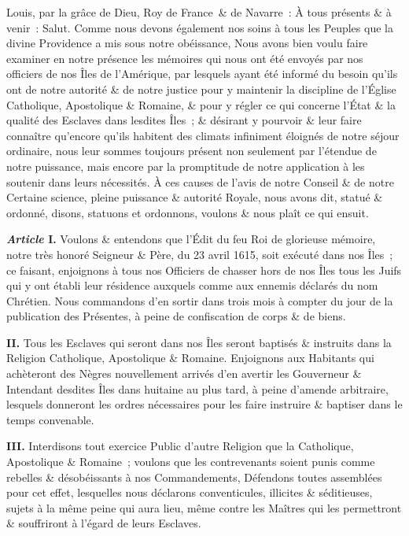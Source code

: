 \documentclass[french,twoside]{book} %
\newcommand{\labelchar}[1]{\textbf{\color{rubric} #1}}
\begin{document}
\noindent Louis, par la grâce de Dieu, Roy de France \& de Navarre : À tous présents \& à venir : Salut. Comme nous devons également nos soins à tous les Peuples que la divine Providence a mis sous notre obéissance, Nous avons bien voulu faire examiner en notre présence les mémoires qui nous ont été envoyés par nos officiers de nos Îles de l’Amérique, par lesquels ayant été informé du besoin qu’ils ont de notre autorité \& de notre justice pour y maintenir la discipline de l’Église Catholique, Apostolique \& Romaine, \& pour y régler ce qui concerne l’État \& la qualité des Esclaves dans lesdites Îles ; \& désirant y pourvoir \& leur faire connaître qu’encore qu’ils habitent des climats infiniment éloignés de notre séjour ordinaire, nous leur sommes toujours présent non seulement par l’étendue de notre puissance, mais encore par la promptitude de notre application à les soutenir dans leurs nécessités. À ces causes de l’avis de notre Conseil \& de notre Certaine science, pleine puissance \& autorité Royale, nous avons dit, statué \& ordonné, disons, statuons et ordonnons, voulons \& nous plaît ce qui ensuit.\par
\bigbreak
\noindent \labelchar{\emph{Article} I.} Voulons \& entendons que l’Édit du feu Roi de glorieuse mémoire, notre très honoré Seigneur \& Père, du 23 avril 1615, soit exécuté dans nos Îles ; ce faisant, enjoignons à tous nos Officiers de chasser hors de nos Îles tous les Juifs qui y ont établi leur résidence auxquels comme aux ennemis déclarés du nom Chrétien. Nous commandons d’en sortir dans trois mois à compter du jour de la publication des Présentes, à peine de confiscation de corps \& de biens.\par
\labelchar{II.} Tous les Esclaves qui seront dans nos Îles seront baptisés \& instruits dans la Religion Catholique, Apostolique \& Romaine. Enjoignons aux Habitants qui achèteront des Nègres nouvellement arrivés d’en avertir les Gouverneur \& Intendant desdites Îles dans huitaine au plus tard, à peine d’amende arbitraire, lesquels donneront les ordres nécessaires pour les faire instruire \& baptiser dans le temps convenable.\par
\labelchar{III.} Interdisons tout exercice Public d’autre Religion que la Catholique, Apostolique \& Romaine ; voulons que les contrevenants soient punis comme rebelles \& désobéissants à nos Commandements, Défendons toutes assemblées pour cet effet, lesquelles nous déclarons conventicules, illicites \& séditieuses, sujets à la même peine qui aura lieu, même contre les Maîtres qui les permettront \& souffriront à l’égard de leurs Esclaves.\par
\end{document}
